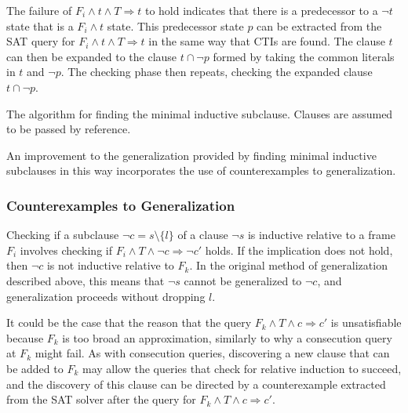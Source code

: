 \documentclass[12pt,a4paper,twoside,openright]{report}
\begin{document}
{The failure of $F_i \wedge t \wedge T \Rightarrow t$ to hold indicates
that there is a predecessor to a $\neg t$ state that is a $F_i \wedge t$ state.
This predecessor state $p$ can be extracted from the SAT query for
$F_i \wedge t \wedge T \Rightarrow t$ in the same way that CTIs are found.
The clause $t$ can then be expanded to the clause $t \cap \neg p$
formed by taking the common literals in $t$ and $\neg p$.
The checking phase then repeats, checking the expanded clause $t \cap \neg p$.

\begin{algorithm}[H]
\DontPrintSemicolon
{}
\caption{The algorithm for finding the minimal inductive subclause. Clauses are assumed
to be passed by reference.}
\label{mic}
\end{algorithm}


An improvement to the generalization provided by finding minimal
inductive subclauses in this way incorporates the use of counterexamples
to generalization.

\subsubsection{Counterexamples to Generalization}

Checking if a subclause $\neg c = s \setminus \{l\}$ of a clause $\neg s$ is inductive
relative to a frame $F_i$ involves checking if
$F_i \wedge T \wedge \neg c \Rightarrow \neg c'$ holds.
If the implication does not hold, then $\neg c$ is not inductive relative to
$F_k$. In the original method of generalization described above,
this means that $\neg s$ cannot be generalized to $\neg c$, and generalization
proceeds without dropping $l$.

It could be the case that the reason that the query
$F_k \wedge T \wedge c \Rightarrow c'$ is unsatisfiable because
$F_k$ is too broad an approximation, similarly to why a consecution
query at $F_k$ might fail. As with consecution queries, discovering a
new clause that can be added to $F_k$ may allow the queries that
check for relative induction to succeed, and the discovery of this
clause can be directed by a counterexample extracted from the
SAT solver after the query for $F_k \wedge T \wedge c \Rightarrow c'$.

}
\end{document}
